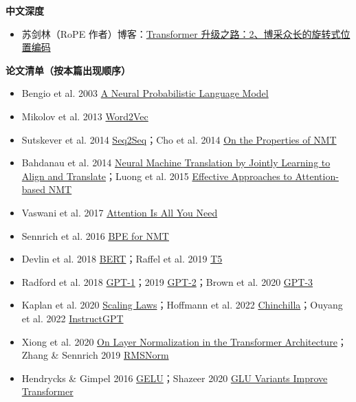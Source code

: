 \textbf{中文深度}
\begin{itemize}
  \item 苏剑林（RoPE 作者）博客：\href{https://kexue.fm/archives/8265}{Transformer 升级之路：2、博采众长的旋转式位置编码}
\end{itemize}

\textbf{论文清单（按本篇出现顺序）}
\begin{itemize}
  \item Bengio et al. 2003 \href{https://www.jmlr.org/papers/volume3/bengio03a/bengio03a.pdf}{A Neural Probabilistic Language Model}
  \item Mikolov et al. 2013 \href{https://arxiv.org/abs/1301.3781}{Word2Vec}
  \item Sutskever et al. 2014 \href{https://arxiv.org/abs/1409.3215}{Seq2Seq}；Cho et al. 2014 \href{https://arxiv.org/abs/1409.1259}{On the Properties of NMT}
  \item Bahdanau et al. 2014 \href{https://arxiv.org/abs/1409.0473}{Neural Machine Translation by Jointly Learning to Align and Translate}；Luong et al. 2015 \href{https://arxiv.org/abs/1508.04025}{Effective Approaches to Attention-based NMT}
  \item Vaswani et al. 2017 \href{https://arxiv.org/abs/1706.03762}{Attention Is All You Need}
  \item Sennrich et al. 2016 \href{https://arxiv.org/abs/1508.07909}{BPE for NMT}
  \item Devlin et al. 2018 \href{https://arxiv.org/abs/1810.04805}{BERT}；Raffel et al. 2019 \href{https://arxiv.org/abs/1910.10683}{T5}
  \item Radford et al. 2018 \href{https://cdn.openai.com/research-covers/language-unsupervised/language\_understanding\_paper.pdf}{GPT-1}；2019 \href{https://cdn.openai.com/better-language-models/language\_models\_are\_unsupervised\_multitask\_learners.pdf}{GPT-2}；Brown et al. 2020 \href{https://arxiv.org/abs/2005.14165}{GPT-3}
  \item Kaplan et al. 2020 \href{https://arxiv.org/abs/2001.08361}{Scaling Laws}；Hoffmann et al. 2022 \href{https://arxiv.org/abs/2203.15556}{Chinchilla}；Ouyang et al. 2022 \href{https://arxiv.org/abs/2203.02155}{InstructGPT}
  \item Xiong et al. 2020 \href{https://arxiv.org/abs/2002.04745}{On Layer Normalization in the Transformer Architecture}；Zhang \& Sennrich 2019 \href{https://arxiv.org/abs/1910.07467}{RMSNorm}
  \item Hendrycks \& Gimpel 2016 \href{https://arxiv.org/abs/1606.08415}{GELU}；Shazeer 2020 \href{https://arxiv.org/abs/2002.05202}{GLU Variants Improve Transformer}

\end{itemize}
